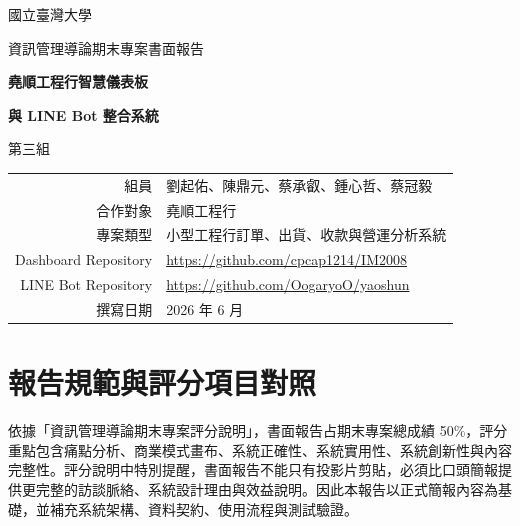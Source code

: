 \documentclass[12pt,a4paper,UTF8,fontset=none]{ctexart}
\newcommand{\linkurl}[1]{\href{#1}{#1}}
\begin{document}
\begin{titlepage}
  \centering
  \vspace*{1.3cm}
  {\Large 國立臺灣大學\par}
  \vspace{0.35cm}
  {\Large 資訊管理導論期末專案書面報告\par}
  \vspace{1.8cm}
  {\Huge\bfseries 堯順工程行智慧儀表板\par}
  \vspace{0.4cm}
  {\Huge\bfseries 與 LINE Bot 整合系統\par}
  \vspace{0.8cm}
  {\Large 第三組\par}
  \vfill
  \begin{tabular}{rl}
    組員 & 劉起佑、陳鼎元、蔡承叡、鍾心哲、蔡冠毅 \\
    合作對象 & 堯順工程行 \\
    專案類型 & 小型工程行訂單、出貨、收款與營運分析系統 \\
    Dashboard Repository & \linkurl{https://github.com/cpcap1214/IM2008} \\
    LINE Bot Repository & \linkurl{https://github.com/OogaryoO/yaoshun} \\
    撰寫日期 & 2026 年 6 月
  \end{tabular}
  \vfill
  
\end{titlepage}

\tableofcontents
\newpage

\section{報告規範與評分項目對照}

依據「資訊管理導論期末專案評分說明」，書面報告占期末專案總成績 50\%，評分重點包含痛點分析、商業模式畫布、系統正確性、系統實用性、系統創新性與內容完整性。評分說明中特別提醒，書面報告不能只有投影片剪貼，必須比口頭簡報提供更完整的訪談脈絡、系統設計理由與效益說明。因此本報告以正式簡報內容為基礎，並補充系統架構、資料契約、使用流程與測試驗證。
\end{document}
